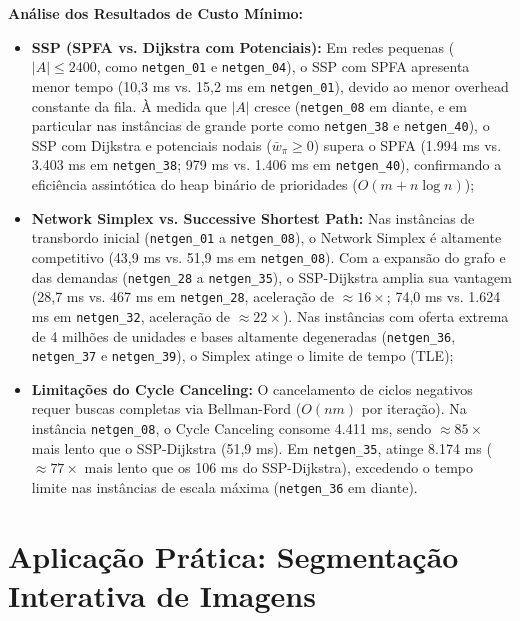 \documentclass[12pt,a4paper]{article}
\begin{document}
\noindent \textbf{Análise dos Resultados de Custo Mínimo:}
\begin{itemize}[leftmargin=1.5em, itemsep=0.15em, topsep=0.2em, parsep=0em]
    \item \textbf{SSP (SPFA vs. Dijkstra com Potenciais):} Em redes pequenas ($|A| \le 2400$, como \texttt{netgen\_01} e \texttt{netgen\_04}), o SSP com SPFA apresenta menor tempo (10,3 ms vs. 15,2 ms em \texttt{netgen\_01}), devido ao menor overhead constante da fila. À medida que $|A|$ cresce (\texttt{netgen\_08} em diante, e em particular nas instâncias de grande porte como \texttt{netgen\_38} e \texttt{netgen\_40}), o SSP com Dijkstra e potenciais nodais ($\bar{w}_\pi \ge 0$) supera o SPFA (1.994 ms vs. 3.403 ms em \texttt{netgen\_38}; 979 ms vs. 1.406 ms em \texttt{netgen\_40}), confirmando a eficiência assintótica do heap binário de prioridades ($O(m + n \log n)$);
    \item \textbf{Network Simplex vs. Successive Shortest Path:} Nas instâncias de transbordo inicial (\texttt{netgen\_01} a \texttt{netgen\_08}), o Network Simplex é altamente competitivo (43,9 ms vs. 51,9 ms em \texttt{netgen\_08}). Com a expansão do grafo e das demandas (\texttt{netgen\_28} a \texttt{netgen\_35}), o SSP-Dijkstra amplia sua vantagem (28,7 ms vs. 467 ms em \texttt{netgen\_28}, aceleração de $\approx 16\times$; 74,0 ms vs. 1.624 ms em \texttt{netgen\_32}, aceleração de $\approx 22\times$). Nas instâncias com oferta extrema de 4 milhões de unidades e bases altamente degeneradas (\texttt{netgen\_36}, \texttt{netgen\_37} e \texttt{netgen\_39}), o Simplex atinge o limite de tempo (TLE);
    \item \textbf{Limitações do Cycle Canceling:} O cancelamento de ciclos negativos requer buscas completas via Bellman-Ford ($O(nm)$ por iteração). Na instância \texttt{netgen\_08}, o Cycle Canceling consome 4.411 ms, sendo $\approx 85\times$ mais lento que o SSP-Dijkstra (51,9 ms). Em \texttt{netgen\_35}, atinge 8.174 ms ($\approx 77\times$ mais lento que os 106 ms do SSP-Dijkstra), excedendo o tempo limite nas instâncias de escala máxima (\texttt{netgen\_36} em diante).
\end{itemize}

\section{Aplicação Prática: Segmentação Interativa de Imagens}\label{sec:segmentacao}
\end{document}
